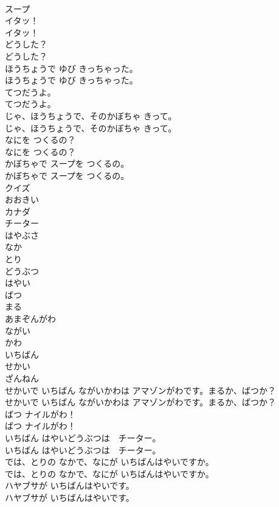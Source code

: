 \documentclass[8pt]{extreport}
\begin{document}
\begin{CJK}{UTF8}{min}
\\	スープ
\\	イタッ！
\\	イタッ！
\\	どうした？
\\	どうした？
\\	ほうちょうで ゆび きっちゃった。
\\	ほうちょうで ゆび きっちゃった。
\\	てつだうよ。
\\	てつだうよ。
\\	じゃ、ほうちょうで、そのかぼちゃ きって。
\\	じゃ、ほうちょうで、そのかぼちゃ きって。
\\	なにを つくるの？
\\	なにを つくるの？
\\	かぼちゃで スープを つくるの。
\\	かぼちゃで スープを つくるの。
\\	クイズ
\\	おおきい
\\	カナダ
\\	チーター
\\	はやぶさ
\\	なか
\\	とり
\\	どうぶつ
\\	はやい
\\	ばつ
\\	まる
\\	あまぞんがわ
\\	ながい
\\	かわ
\\	いちばん
\\	せかい
\\	ざんねん
\\	せかいで いちばん ながいかわは アマゾンがわです。まるか、ばつか？
\\	せかいで いちばん ながいかわは アマゾンがわです。まるか、ばつか？
\\	ばつ ナイルがわ！
\\	ばつ ナイルがわ！
\\	いちばん はやいどうぶつは　チーター。
\\	いちばん はやいどうぶつは　チーター。
\\	では、とりの なかで、なにが いちばんはやいですか。
\\	では、とりの なかで、なにが いちばんはやいですか。
\\	ハヤブサが いちばんはやいです。
\\	ハヤブサが いちばんはやいです。

\end{CJK}
\end{document}
